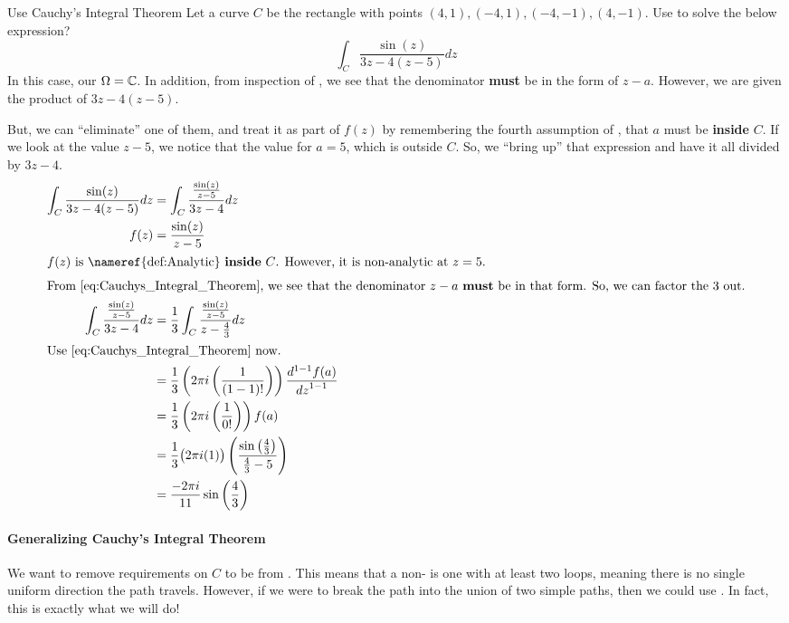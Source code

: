 \begin{example}{Use Cauchy's Integral Theorem}
  Let a curve $C$ be the rectangle with points $(4, 1), (-4, 1), (-4, -1), (4, -1)$.
  Use  to solve the below expression?
  \begin{equation*}
    \int_{C} \frac{\sin(z)}{3z-4 (z-5)} dz
  \end{equation*}
  \tcblower{}
  In this case, our $\Omega = \operatorname{\mathbb{C}}$.
  In addition, from inspection of , we see that the denominator \textbf{must} be in the form of $z-a$.
  However, we are given the product of $3z-4 (z-5)$.

  But, we can ``eliminate'' one of them, and treat it as part of $f(z)$ by remembering the fourth assumption of , that $a$ must be \textbf{inside} $C$.
  If we look at the value $z-5$, we notice that the value for $a = 5$, which is outside $C$.
  So, we ``bring up'' that expression and have it all divided by $3z-4$.
  \begin{align*}
    \int_{C} \frac{\sin(z)}{3z-4 (z-5)} dz &= \int_{C} \frac{\frac{\sin(z)}{z-5}}{3z-4} dz \\
    f(z) &= \frac{\sin(z)}{z-5} \\
    \intertext{$f(z)$ is \nameref{def:Analytic} \textbf{inside} $C$. However, it is non-analytic at $z = 5$.}
    \intertext{From \Cref{eq:Cauchys_Integral_Theorem}, we see that the denominator $z-a$ \textbf{must} be in that form. So, we can factor the $3$ out.}
    \int_{C} \frac{\frac{\sin(z)}{z-5}}{3z-4} dz &= \frac{1}{3} \int_{C} \frac{\frac{\sin(z)}{z-5}}{z-\frac{4}{3}} dz \\
    \shortintertext{Use \Cref{eq:Cauchys_Integral_Theorem} now.}
                                           &= \frac{1}{3} \left( 2 \pi i \left( \frac{1}{(1-1)!} \right) \right) \frac{d^{1-1} f(a)}{{dz}^{1-1}} \\
                                           &= \frac{1}{3} \left( 2 \pi i \left( \frac{1}{0!} \right) \right) f(a) \\
                                           &= \frac{1}{3} \bigl( 2 \pi i (1) \bigr) \left( \frac{\sin \left( \frac{4}{3} \right)}{\frac{4}{3} - 5} \right) \\
    &= \frac{-2 \pi i}{11} \sin \left( \frac{4}{3} \right)
  \end{align*}
\end{example}

\paragraph{Generalizing Cauchy's Integral Theorem}\label{par:Generalize_Cauchy_Integral_Theorem}
We want to remove requirements on $C$ to be  from .
This means that a non- is one with at least two loops, meaning there is no single uniform direction the path travels.
However, if we were to break the path into the union of two simple paths, then we could use .
In fact, this is exactly what we will do!

